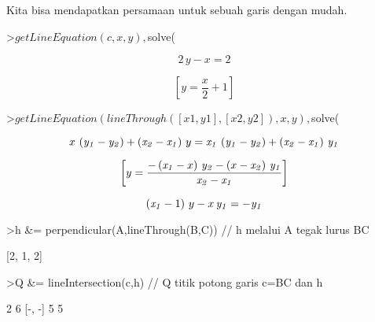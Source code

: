 \documentclass[12pt,arial,letterpaper]{book}
\begin{document}
\begin{eulernootebook}
\begin{eulercomment}
\begin{eulercomment}
\begin{eulernootebook}
\begin{eulercomment}
\begin{eulercomment}
\begin{eulercomment}
\begin{eulercomment}
\begin{eulercomment}
\begin{eulercomment}
\begin{eulernotebook}
\begin{eulercomment}
\begin{eulercomment}
\begin{euleroutput}
\end{euleroutput}
\begin{eulercomment}
Kita bisa mendapatkan persamaan untuk sebuah garis dengan mudah.
\end{eulercomment}
\begin{eulerprompt}
>$getLineEquation(c,x,y), $solve(%
\end{eulerprompt}
\begin{eulerformula}
\[
2\,y-x=2
\]
\end{eulerformula}
\begin{eulerformula}
\[
\left[ y=\frac{x}{2}+1 \right] 
\]
\end{eulerformula}
\begin{eulerprompt}
>$getLineEquation(lineThrough([x1,y1],[x2,y2]),x,y), $solve(%
\end{eulerprompt}
\begin{eulerformula}
\[
x\,\left({\it y_1}-{\it y_2}\right)+\left({\it x_2}-{\it x_1}
 \right)\,y={\it x_1}\,\left({\it y_1}-{\it y_2}\right)+\left(
 {\it x_2}-{\it x_1}\right)\,{\it y_1}
\]
\end{eulerformula}
\begin{eulerformula}
\[
\left[ y=\frac{-\left({\it x_1}-x\right)\,{\it y_2}-\left(x-
 {\it x_2}\right)\,{\it y_1}}{{\it x_2}-{\it x_1}} \right] 
\]
\end{eulerformula}
\begin{eulerformula}
\[
\left({\it x_1}-1\right)\,y-x\,{\it y_1}=-{\it y_1}
\]
\end{eulerformula}
\begin{eulerprompt}
>h &= perpendicular(A,lineThrough(B,C)) // h melalui A tegak lurus BC
\end{eulerprompt}
\begin{euleroutput}
  
                                [2, 1, 2]
  
\end{euleroutput}
\begin{eulerprompt}
>Q &= lineIntersection(c,h) // Q titik potong garis c=BC dan h
\end{eulerprompt}
\begin{euleroutput}
  
                                   2  6
                                  [-, -]
                                   5  5
  

\end{euleroutput}
\end{eulercomment}
\end{eulercomment}
\end{eulernotebook}
\end{eulercomment}
\end{eulercomment}
\end{eulercomment}
\end{eulercomment}
\end{eulercomment}
\end{eulercomment}
\end{eulernootebook}
\end{eulercomment}
\end{eulercomment}
\end{eulernootebook}
\end{document}
